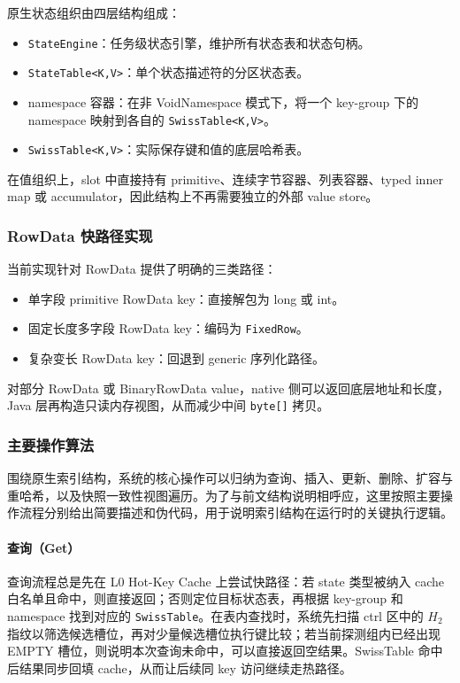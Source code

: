 \documentclass[a4paper,11pt]{article}
\begin{document}
原生状态组织由四层结构组成：

\begin{itemize}
  \item \texttt{StateEngine}：任务级状态引擎，维护所有状态表和状态句柄。
  \item \texttt{StateTable<K,V>}：单个状态描述符的分区状态表。
  \item namespace 容器：在非 VoidNamespace 模式下，将一个 key-group 下的 namespace 映射到各自的 \texttt{SwissTable<K,V>}。
  \item \texttt{SwissTable<K,V>}：实际保存键和值的底层哈希表。
\end{itemize}

在值组织上，slot 中直接持有 primitive、连续字节容器、列表容器、typed inner map 或 accumulator，因此结构上不再需要独立的外部 value store。

\subsubsection{RowData 快路径实现}

当前实现针对 RowData 提供了明确的三类路径：

\begin{itemize}
  \item 单字段 primitive RowData key：直接解包为 long 或 int。
  \item 固定长度多字段 RowData key：编码为 \texttt{FixedRow}。
  \item 复杂变长 RowData key：回退到 generic 序列化路径。
\end{itemize}

对部分 RowData 或 BinaryRowData value，native 侧可以返回底层地址和长度，Java 层再构造只读内存视图，从而减少中间 \texttt{byte[]} 拷贝。

\subsubsection{主要操作算法}

围绕原生索引结构，系统的核心操作可以归纳为查询、插入、更新、删除、扩容与重哈希，以及快照一致性视图遍历。为了与前文结构说明相呼应，这里按照主要操作流程分别给出简要描述和伪代码，用于说明索引结构在运行时的关键执行逻辑。

\paragraph{查询（Get）}

查询流程总是先在 L0 Hot-Key Cache 上尝试快路径：若 state 类型被纳入 cache 白名单且命中，则直接返回；否则定位目标状态表，再根据 key-group 和 namespace 找到对应的 \texttt{SwissTable}。在表内查找时，系统先扫描 ctrl 区中的 \(H_2\) 指纹以筛选候选槽位，再对少量候选槽位执行键比较；若当前探测组内已经出现 EMPTY 槽位，则说明本次查询未命中，可以直接返回空结果。SwissTable 命中后结果同步回填 cache，从而让后续同 key 访问继续走热路径。
\end{document}
